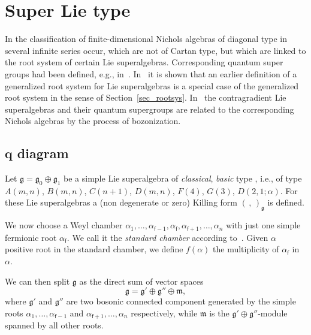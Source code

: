\documentclass[10pt,a4paper]{amsart}
\numberwithin{equation}{section}
\newcommand{\f}{\mathsf{f}}
\begin{document}
\section{Super Lie type}\label{SuperLie}

In the classification of finite-dimensional Nichols algebras of diagonal type in~\cite{Heck07} several infinite series occur, which are not of Cartan type, but which are linked to the root system of certain Lie superalgebras. Corresponding quantum super groups had been defined, e.g., in~\cite{KT91}. In~\cite[Example~9 and Theorem~24]{HY08} it is shown that an earlier definition of a generalized root system for Lie superalgebras \cite{Ser96} is a special case of the generalized root system in the sense of Section~\ref{sec_rootsys}. In~\cite{AAY11} the contragradient Lie superalgebras and their quantum supergroups are related to the corresponding Nichols algebras by the process of bozonization.

\subsection[$q$ diagram]{$\boldsymbol{q}$ diagram}

Let $\mathfrak{g} = \mathfrak{g_0} \oplus \mathfrak{g_1}$ be a simple Lie superalgebra of \emph{classical}, \emph{basic} type \cite{FSS96}, i.e., of type $A(m, n)$, $B(m, n)$, $C(n + 1)$, $D(m, n)$, $F(4)$, $G(3)$, $D(2, 1; \alpha)$. For these Lie superalgebras a (non degenerate or zero) Killing form $(\, ,\,)_\mathfrak{g} $ is defined.

We now choose a Weyl chamber $ \alpha_1, \dots, \alpha_{\f-1}, \alpha_\f,  \alpha_{\f+1}, \dots, \alpha_{n}$ with just one simple fermionic root $\alpha_\f$. We call it the \emph{standard chamber} according to~\cite{Kac77}. Given $\alpha$ positive root in the standard chamber, we define $f(\alpha)$ the multiplicity of $\alpha_\f$ in $\alpha$.

We can then split $\mathfrak{g}$ as the direct sum of vector spaces
\[\mathfrak{g} = \mathfrak{g'} \oplus \mathfrak{g''} \oplus \mathfrak{m},\]
where $\mathfrak{g'}$ and $\mathfrak{g''}$ are two bosonic connected component generated by the simple roots $ \alpha_1, \dots, \alpha_{\f-1}$ and $ \alpha_{\f+1}, \dots, \alpha_{n}$ respectively, while $\mathfrak{m}$ is the $\mathfrak{g'} \oplus \mathfrak{g''}$-module spanned by all other roots.
\end{document}
